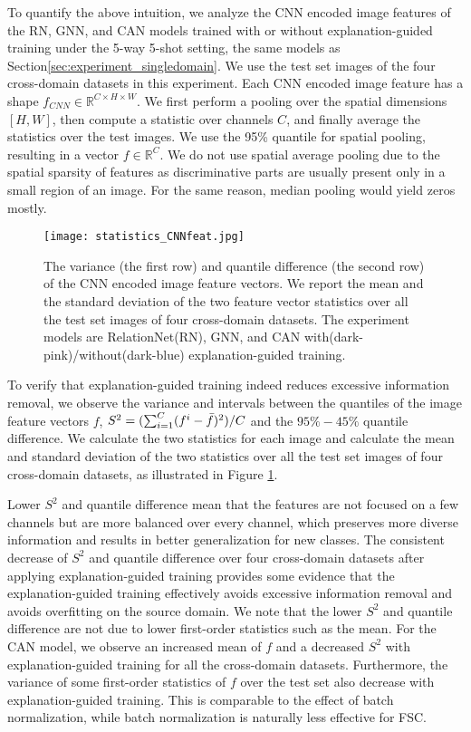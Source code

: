 \documentclass[a4paper,conference]{IEEEtran}
\begin{document}
To quantify the above intuition, we analyze the CNN encoded image features of the RN, GNN, and CAN models trained with or without explanation-guided training under the 5-way 5-shot setting, the same models as Section\ref{sec:experiment_singledomain}. We use the test set images of the four cross-domain datasets in this experiment. 
Each CNN encoded image feature has a shape $f_{CNN}\in\mathbb{R}^{C\times H\times W}$. We first perform a pooling over the spatial dimensions $[H,W]$, then compute a statistic over channels $C$, and finally average the statistics over the test images. We use the 95\% quantile for spatial pooling, resulting in a vector $f\in \mathbb{R}^C$. We do not use spatial average pooling due to the spatial sparsity of features as discriminative parts are usually present only in a small region of an image. For the same reason, median pooling would yield zeros mostly.
\begin{figure}
    \centering
    \texttt{[image: statistics\_CNNfeat.jpg]}
    \caption{The variance (the first row) and quantile difference (the second row) of the CNN encoded image feature vectors. We report the mean and the standard deviation of the two feature vector statistics over all the test set images of four cross-domain datasets. The experiment models are RelationNet(RN), GNN, and CAN with(dark-pink)/without(dark-blue) explanation-guided training.}
    \label{fig:statistics_variance_quantile_diff}
\end{figure}
To verify that explanation-guided training indeed reduces excessive information removal, we observe the variance and intervals between the quantiles of the image feature vectors $f$, 
$S^2=(\sum_{i=1}^C(f^i-\Bar{f})^2)/C$ and the $95\% -45\%$ quantile difference. We calculate the two statistics for each image and calculate the mean and standard deviation of the two statistics over all the test set images of four cross-domain datasets, as illustrated in Figure \ref{fig:statistics_variance_quantile_diff}.

Lower $S^2$ and quantile difference mean that the features are not focused on a few channels but are more balanced over every channel, which preserves more diverse information and results in better generalization for new classes.
The consistent decrease of $S^2$ and quantile difference over four cross-domain datasets after applying explanation-guided training provides some evidence that the explanation-guided training effectively avoids excessive information removal and avoids overfitting on the source domain. We note that the lower $S^2$ and quantile difference are not due to lower first-order statistics such as the mean. For the CAN model, we observe an increased mean of $f$ and a decreased $S^2$ with explanation-guided training for all the cross-domain datasets.
Furthermore, the variance of some first-order statistics of $f$ over the test set also decrease with explanation-guided training. This is comparable to the effect of batch normalization, while batch normalization is naturally less effective for FSC.
\end{document}

